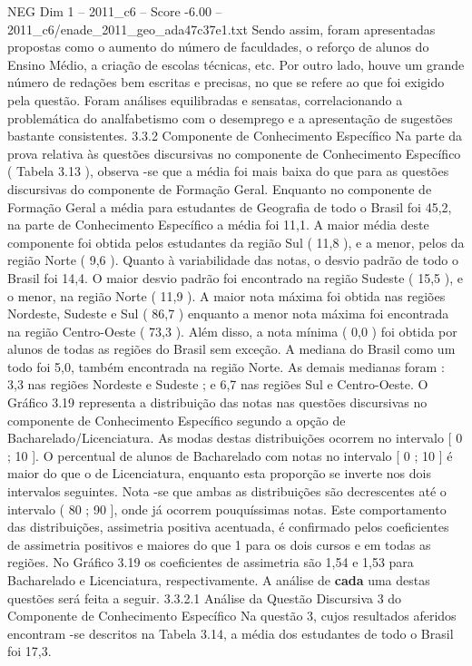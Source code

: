 \begin{textsample}{NEG Dim 1 – 2011\_c6 – Score -6.00 – 2011\_c6/enade\_2011\_geo\_ada47c37e1.txt}
Sendo assim, foram apresentadas propostas como o aumento do número de faculdades, o reforço de alunos do Ensino Médio, a criação de escolas técnicas, etc.
Por outro lado, houve um grande número de redações bem escritas e precisas, no que se refere ao que foi exigido pela questão.
Foram análises equilibradas e sensatas, correlacionando a problemática do analfabetismo com o desemprego e a apresentação de sugestões bastante consistentes. 3.3.2 Componente de Conhecimento Específico Na parte da prova relativa às questões discursivas no componente de Conhecimento Específico ( Tabela 3.13 ), observa -se que a média foi mais baixa do que para as questões discursivas do componente de Formação Geral.
Enquanto no componente de Formação Geral a média para estudantes de Geografia de todo o Brasil foi 45,2, na parte de Conhecimento Específico a média foi 11,1.
A maior média deste componente foi obtida pelos estudantes da região Sul ( 11,8 ), e a menor, pelos da região Norte ( 9,6 ).
Quanto à variabilidade das notas, o desvio padrão de todo o Brasil foi 14,4.
O maior desvio padrão foi encontrado na região Sudeste ( 15,5 ), e o menor, na região Norte ( 11,9 ).
A maior nota máxima foi obtida nas regiões Nordeste, Sudeste e Sul ( 86,7 ) enquanto a menor nota máxima foi encontrada na região Centro-Oeste ( 73,3 ).
Além disso, a nota mínima ( 0,0 ) foi obtida por alunos de todas as regiões do Brasil sem exceção.
A mediana do Brasil como um todo foi 5,0, também encontrada na região Norte.
As demais medianas foram : 3,3 nas regiões Nordeste e Sudeste ; e 6,7 nas regiões Sul e Centro-Oeste.
O Gráfico 3.19 representa a distribuição das notas nas questões discursivas no componente de Conhecimento Específico segundo a opção de Bacharelado/Licenciatura.
As modas destas distribuições ocorrem no intervalo [ 0 ; 10 ].
O percentual de alunos de Bacharelado com notas no intervalo [ 0 ; 10 ] é maior do que o de Licenciatura, enquanto esta proporção se inverte nos dois intervalos seguintes.
Nota -se que ambas as distribuições são decrescentes até o intervalo ( 80 ; 90 ], onde já ocorrem pouquíssimas notas.
Este comportamento das distribuições, assimetria positiva acentuada, é confirmado pelos coeficientes de assimetria positivos e maiores do que 1 para os dois cursos e em todas as regiões.
No Gráfico 3.19 os coeficientes de assimetria são 1,54 e 1,53 para Bacharelado e Licenciatura, respectivamente.
A análise de \textbf{cada} uma destas questões será feita a seguir. 3.3.2.1 Análise da Questão Discursiva 3 do Componente de Conhecimento Específico Na questão 3, cujos resultados aferidos encontram -se descritos na Tabela 3.14, a média dos estudantes de todo o Brasil foi 17,3.

\end{textsample}
